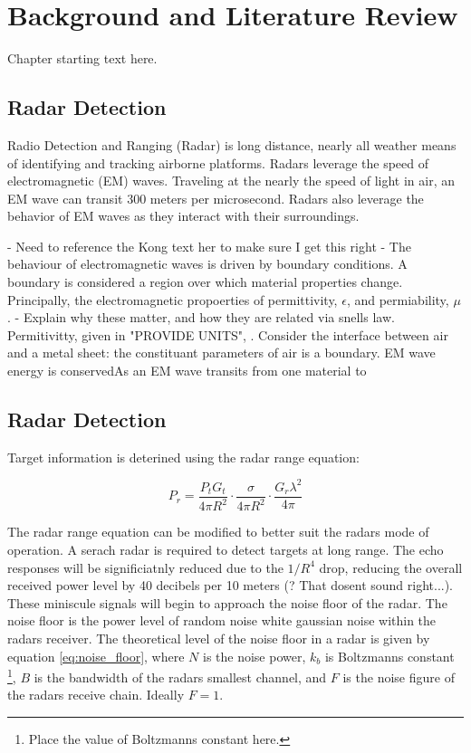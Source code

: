 \chapter{Background and Literature Review}
\label{ch:background}
\glsresetall
{
Chapter starting text here.}

\section{Radar Detection}
\label{sec:RD}

Radio Detection and Ranging (Radar) is long distance, nearly all weather means of identifying and tracking airborne platforms. Radars leverage the speed of electromagnetic (EM) waves. Traveling at the nearly the speed of light in air, an EM wave can transit 300 meters per microsecond. Radars also leverage the behavior of EM waves as they interact with their surroundings.

	- Need to reference the Kong text her to make sure I get this right
	- The behaviour of electromagnetic waves is driven by boundary conditions. A boundary is considered a region over which material properties change. Principally, the electromagnetic propoerties of permittivity, $\epsilon$, and permiability, $\mu$.
	- Explain why these matter, and how they are related via snells law. Permitivitty, given in "PROVIDE UNITS", . Consider the interface between air and a metal sheet:  the constituant parameters of air is a boundary. EM wave energy is conservedAs an EM wave transits from one material to



\section{Radar Detection}

Target information is deterined using the radar range equation:

\begin{equation}\label{eq:rre}
	P_{r} = \frac{P_t G_t}{4 \pi R^2} \cdot \frac{\sigma}{4 \pi R^2} \cdot \frac{G_r \lambda^2}{4 \pi}
\end{equation}

The radar range equation can  be modified to better suit the radars mode of operation. A serach radar is required to detect targets at long range. The echo responses will be significiatnly reduced due to the $1/R^4$ drop, reducing the overall received power level by 40 decibels per 10 meters (? That dosent sound right...). These miniscule signals will begin to approach the noise floor of the radar. The noise floor is the power level of random noise white gaussian noise within the radars receiver. The theoretical level of the noise floor in a radar is given by equation \ref{eq:noise_floor}, where $N$ is the noise power, $k_b$ is Boltzmanns constant \footnote{Place the value of Boltzmanns constant here.}, $B$ is the bandwidth of the radars smallest channel, and $F$ is the noise figure of the radars receive chain. Ideally $F=1$.

